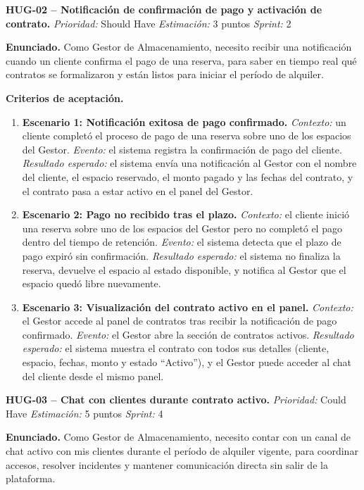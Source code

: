 \textbf{HUG-02 -- Notificación de confirmación de pago y activación de contrato.} \label{req:HUG-02}
\textit{Prioridad:} Should Have \quad \textit{Estimación:} 3 puntos \quad \textit{Sprint:} 2

\textbf{Enunciado.} Como Gestor de Almacenamiento, necesito recibir una notificación cuando un cliente confirma el pago de una reserva, para saber en tiempo real qué contratos se formalizaron y están listos para iniciar el período de alquiler.

\textbf{Criterios de aceptación.}
\begin{enumerate}
\item \textbf{Escenario 1: Notificación exitosa de pago confirmado.} \textit{Contexto:} un cliente completó el proceso de pago de una reserva sobre uno de los espacios del Gestor. \textit{Evento:} el sistema registra la confirmación de pago del cliente. \textit{Resultado esperado:} el sistema envía una notificación al Gestor con el nombre del cliente, el espacio reservado, el monto pagado y las fechas del contrato, y el contrato pasa a estar activo en el panel del Gestor.
\item \textbf{Escenario 2: Pago no recibido tras el plazo.} \textit{Contexto:} el cliente inició una reserva sobre uno de los espacios del Gestor pero no completó el pago dentro del tiempo de retención. \textit{Evento:} el sistema detecta que el plazo de pago expiró sin confirmación. \textit{Resultado esperado:} el sistema no finaliza la reserva, devuelve el espacio al estado disponible, y notifica al Gestor que el espacio quedó libre nuevamente.
\item \textbf{Escenario 3: Visualización del contrato activo en el panel.} \textit{Contexto:} el Gestor accede al panel de contratos tras recibir la notificación de pago confirmado. \textit{Evento:} el Gestor abre la sección de contratos activos. \textit{Resultado esperado:} el sistema muestra el contrato con todos sus detalles (cliente, espacio, fechas, monto y estado ``Activo''), y el Gestor puede acceder al chat del cliente desde el mismo panel.
\end{enumerate}

\textbf{HUG-03 -- Chat con clientes durante contrato activo.} \label{req:HUG-03}
\textit{Prioridad:} Could Have \quad \textit{Estimación:} 5 puntos \quad \textit{Sprint:} 4

\textbf{Enunciado.} Como Gestor de Almacenamiento, necesito contar con un canal de chat activo con mis clientes durante el período de alquiler vigente, para coordinar accesos, resolver incidentes y mantener comunicación directa sin salir de la plataforma.

